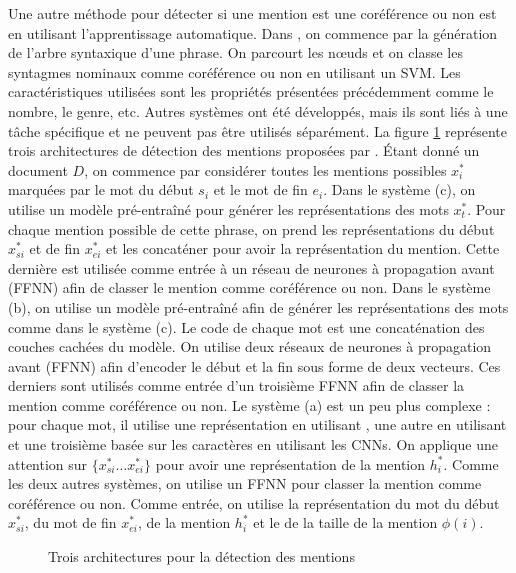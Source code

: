 \documentclass{KodeBook}
\begin{document}
Une autre méthode pour détecter si une mention est une coréférence ou non est en utilisant l'apprentissage automatique. 
Dans \cite{2013-uryupina-moschitti}, on commence par la génération de l'arbre syntaxique d'une phrase. 
On parcourt les nœuds et on classe les syntagmes nominaux comme coréférence ou non en utilisant un SVM. 
Les caractéristiques utilisées sont les propriétés présentées précédemment comme le nombre, le genre, etc.
Autres systèmes ont été développés, mais ils sont liés à une tâche spécifique et ne peuvent pas être utilisés séparément. 
La figure \ref{fig:det-mention-yu} représente trois architectures de détection des mentions proposées par \citet{2020-yu-al}. 
Étant donné un document $D$, on commence par considérer toutes les mentions possibles $x^*_i$ marquées par le mot du début $s_i$ et le mot de fin $e_i$. 
Dans le système (c), on utilise un modèle  pré-entraîné pour générer les représentations des mots $x^*_t$. 
Pour chaque mention possible de cette phrase, on prend les représentations du début $x^*_{si}$ et de fin $x^*_{ei}$ et les concaténer pour avoir la représentation du mention. 
Cette dernière est utilisée comme entrée à un réseau de neurones à propagation avant (FFNN) afin de classer le mention comme coréférence ou non. 
Dans le système (b), on utilise un modèle  pré-entraîné afin de générer les représentations des mots comme dans le système (c). 
Le code de chaque mot est une concaténation des couches cachées du modèle.
On utilise deux réseaux de neurones à propagation avant (FFNN) afin d'encoder le début et la fin sous forme de deux vecteurs. 
Ces derniers sont utilisés comme entrée d'un troisième FFNN afin de classer la mention comme coréférence ou non. 
Le système (a) est un peu plus complexe : pour chaque mot, il utilise une représentation en utilisant , une autre en utilisant  et une troisième basée sur les caractères en utilisant les CNNs. 
On applique une attention sur $\{x^*_{si}\ldots x^*_{ei}\}$ pour avoir une représentation de la mention $h^*_i$. 
Comme les deux autres systèmes, on utilise un FFNN pour classer la mention comme coréférence ou non. 
Comme entrée, on utilise la représentation du mot du début $x^*_{si}$, du mot de fin $x^*_{ei}$, de la mention $h^*_i$ et le  de la taille de la mention $\phi(i)$.
\begin{figure}[ht]
	\centering
	\caption[Trois architectures pour la détection des mentions]{Trois architectures pour la détection des mentions \cite{2020-yu-al}}
	\label{fig:det-mention-yu}
\end{figure}
\end{document}
